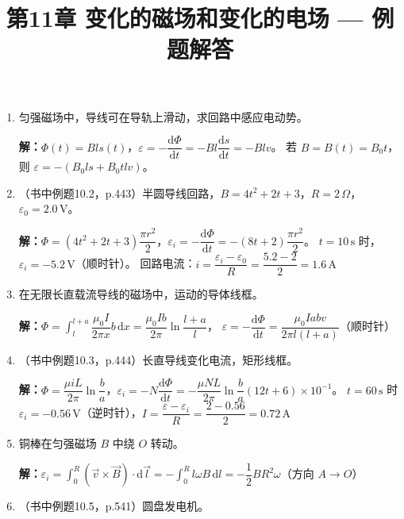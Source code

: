 \documentclass{ctexart}
\title{\textbf{第11章 变化的磁场和变化的电场} --- 例题解答}
\author{}
\date{}
\begin{document}
\maketitle

\begin{enumerate}

\item 匀强磁场中，导线可在导轨上滑动，求回路中感应电动势。

\textbf{解：}$\Phi(t) = Bls(t)$，$\varepsilon = -\dfrac{\mathrm{d}\Phi}{\mathrm{d}t} = -Bl\dfrac{\mathrm{d}s}{\mathrm{d}t} = -Blv$。
若 $B = B(t) = B_0 t$，则 $\varepsilon = -(B_0 l s + B_0 t l v)$。

\item（书中例题10.2，p.443）半圆导线回路，$B = 4t^{2} + 2t + 3$，$R = 2\,\Omega$，$\varepsilon_0 = 2.0\,\text{V}$。

\textbf{解：}$\Phi = (4t^{2} + 2t + 3)\dfrac{\pi r^{2}}{2}$，$\varepsilon_i = -\dfrac{\mathrm{d}\Phi}{\mathrm{d}t} = -(8t + 2)\dfrac{\pi r^{2}}{2}$。
$t = 10\,\text{s}$ 时，$\varepsilon_i = -5.2\,\text{V}$（顺时针）。
回路电流：$i = \dfrac{\varepsilon_i - \varepsilon_0}{R} = \dfrac{5.2 - 2}{2} = 1.6\,\text{A}$

\item 在无限长直载流导线的磁场中，运动的导体线框。

\textbf{解：}$\Phi = \displaystyle\int_l^{l+a} \dfrac{\mu_0 I}{2\pi x}b\,\mathrm{d}x = \dfrac{\mu_0 I b}{2\pi}\ln\dfrac{l+a}{l}$，
$\varepsilon = -\dfrac{\mathrm{d}\Phi}{\mathrm{d}t} = \dfrac{\mu_0 I a b v}{2\pi l(l+a)}$（顺时针）

\item（书中例题10.3，p.444）长直导线变化电流，矩形线框。

\textbf{解：}$\Phi = \dfrac{\mu i L}{2\pi}\ln\dfrac{b}{a}$，$\varepsilon_i = -N\dfrac{\mathrm{d}\Phi}{\mathrm{d}t} = -\dfrac{\mu N L}{2\pi}\ln\dfrac{b}{a}(12t + 6)\times10^{-1}$。
$t = 60\,\text{s}$ 时 $\varepsilon_i = -0.56\,\text{V}$（逆时针），$I = \dfrac{\varepsilon - \varepsilon_i}{R} = \dfrac{2 - 0.56}{2} = 0.72\,\text{A}$

\item 铜棒在匀强磁场 $B$ 中绕 $O$ 转动。

\textbf{解：}$\varepsilon_i = \displaystyle\int_0^R (\vec{v}\times\vec{B})\cdot\mathrm{d}\vec{l} = -\int_0^R l\omega B\,\mathrm{d}l = -\dfrac12 B R^{2}\omega$（方向 $A \to O$）

\item（书中例题10.5，p.541）圆盘发电机。


\end{enumerate}
\end{document}

